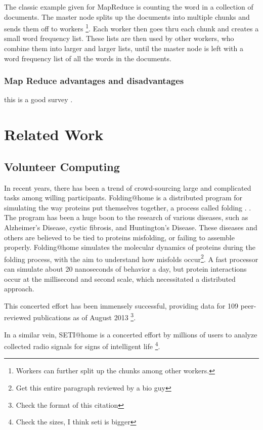 \documentclass[conference, compsocconf, letterpaper]{IEEEtran}
\begin{document}
The classic example given for MapReduce is counting the word in a collection of documents.  The master node splits up the documents into multiple chunks and sends them off to workers  \footnote{Workers can further split up the chunks among other workers.}.  Each worker then goes thru each chunk and creates a small word frequency list.  These lists are then used by other workers, who combine them into larger and larger lists, until the master node is left with a word frequency list of all the words in the documents. 



\subsubsection{Map Reduce advantages and disadvantages}
this is a good survey \cite{mrsurvey}.




\section{Related Work}

\subsection{Volunteer Computing}
In recent years, there has been a trend of crowd-sourcing large and complicated tasks among willing participants.  Folding@home is a distributed program for simulating the way proteins put themselves together, a process called folding \cite{folding}.  \cite{folding}.  The program has been a huge boon to the research of various diseases, such as Alzheimer's Disease, cystic fibrosis, and Huntington's Disease.  These diseases and others are believed to be tied to proteins misfolding, or failing to assemble properly.  Folding@home simulates the molecular dynamics of proteins during the folding process, with the aim to understand  how misfolds occur\footnote{Get this entire paragraph reviewed by a bio guy}.  A fast processor can simulate about 20 nanoseconds of behavior a day, but protein interactions occur at the millisecond and second scale, which necessitated a distributed approach.  

This concerted effort has been immensely successful, providing data for 109 peer-reviewed publications as of August 2013 \cite{foldingPapers}\footnote{Check the format of this citation}.

In a similar vein, SETI@home is a concerted effort by millions of users to analyze collected radio signals for signs of intelligent life \cite{anderson2002seti}\footnote{Check the sizes, I think seti is bigger}.
\end{document}
